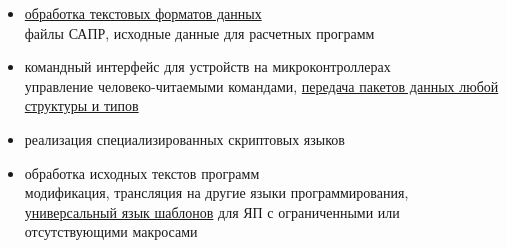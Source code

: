 
\begin{itemize}[nosep]
\item \underline{обработка текстовых форматов данных}\\
	файлы САПР, исходные данные для расчетных программ
\item командный интерфейс для устройств на микроконтроллерах\\
	управление человеко-читаемыми командами, \underline{передача пакетов данных
	любой структуры и типов}
\item реализация специализированных скриптовых языков
\item обработка исходных текстов программ\\
	модификация, трансляция на другие языки программирования,\\ 
	\underline{универсальный язык шаблонов}
	для ЯП с ограниченными или отсутствующими макросами
\end{itemize}